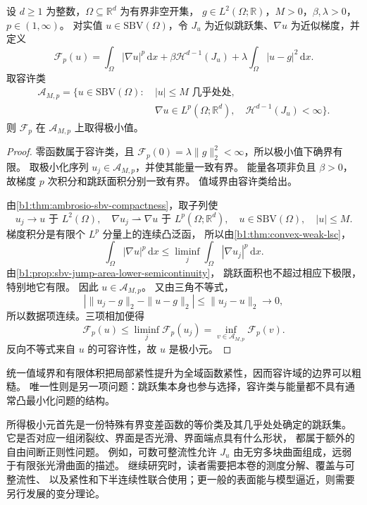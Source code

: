 \begin{theorem}
\label{b1:thm:mumford-shah-existence}
设 \(d\ge1\) 为整数，\(\Omega\subseteq\mathbb R^d\) 为有界非空开集，
\(g\in L^2(\Omega;\mathbb R)\)，\(M>0\)，\(\beta,\lambda>0\)，\(p\in(1,\infty)\)。
对实值 \(u\in\mathrm{SBV}(\Omega)\)，令 \(J_u\) 为近似跳跃集、\(\nabla u\) 为近似梯度，并定义
\[
 \mathcal F_p(u)=\int_\Omega|\nabla u|^p\,\mathrm dx
 +\beta\mathcal H^{d-1}(J_u)
 +\lambda\int_\Omega|u-g|^2\,\mathrm dx.
\]
取容许类
\[
 \begin{aligned}
 \mathcal A_{M,p}=\{u\in\mathrm{SBV}(\Omega):\ &
 |u|\le M\text{ 几乎处处},\\
 &\nabla u\in L^p(\Omega;\mathbb R^d),\quad
 \mathcal H^{d-1}(J_u)<\infty\}.
 \end{aligned}
\]
则 \(\mathcal F_p\) 在 \(\mathcal A_{M,p}\) 上取得极小值。
\end{theorem}
\begin{proof}
零函数属于容许类，且
\(\mathcal F_p(0)=\lambda\|g\|_2^2<\infty\)，所以极小值下确界有限。
取极小化序列 \(u_j\in\mathcal A_{M,p}\)，并使其能量一致有界。
能量各项非负且 \(\beta>0\)，故梯度 \(p\) 次积分和跳跃面积分别一致有界。
值域界由容许类给出。

由\cref{b1:thm:ambrosio-sbv-compactness}，取子列使
\[
 u_j\to u\text{ 于 }L^2(\Omega),\quad
 \nabla u_j\rightharpoonup\nabla u\text{ 于 }L^p(\Omega;\mathbb R^d),
 \quad u\in \mathrm{SBV}(\Omega),\quad |u|\le M.
\]
梯度积分是有限个 \(L^p\) 分量上的连续凸泛函，
所以由\cref{b1:thm:convex-weak-lsc}，
\[
 \int_\Omega|\nabla u|^p\,\mathrm dx
 \le\liminf_j\int_\Omega|\nabla u_j|^p\,\mathrm dx.
\]
由\cref{b1:prop:sbv-jump-area-lower-semicontinuity}，
跳跃面积也不超过相应下极限，特别地它有限。
因此 \(u\in\mathcal A_{M,p}\)。
又由三角不等式，
\[
 \left|\|u_j-g\|_2-\|u-g\|_2\right|
 \le\|u_j-u\|_2\longrightarrow0,
\]
所以数据项连续。三项相加便得
\[
 \mathcal F_p(u)\le\liminf_j\mathcal F_p(u_j)
 =\inf_{v\in\mathcal A_{M,p}}\mathcal F_p(v).
\]
反向不等式来自 \(u\) 的可容许性，故 \(u\) 是极小元。
\end{proof}

统一值域界和有限体积把局部紧性提升为全域函数紧性，因而容许域的边界可以粗糙。
唯一性则是另一项问题：跳跃集本身也参与选择，容许类与能量都不具有通常凸最小化问题的结构。

\ProseParagraphBreak

所得极小元首先是一份特殊有界变差函数的等价类及其几乎处处确定的跳跃集。
它是否对应一组闭裂纹、界面是否光滑、界面端点具有什么形状，
都属于额外的自由间断正则性问题。
例如，可数可整流性允许 \(J_u\) 由无穷多块曲面组成，远弱于有限张光滑曲面的描述。
继续研究时，读者需要把本卷的测度分解、覆盖与可整流性、
以及紧性和下半连续性联合使用；更一般的表面能与模型逼近，则需要另行发展的变分理论。
